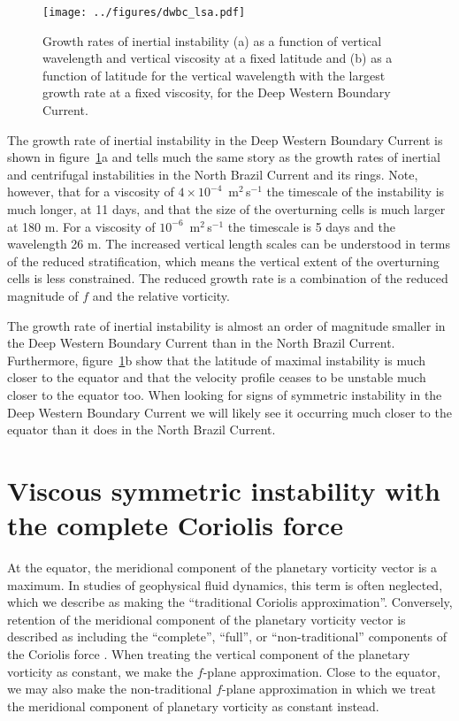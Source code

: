 \begin{figure}[t]
    \centering
    \texttt{[image: ../figures/dwbc\_lsa.pdf]}
    \caption{Growth rates of inertial instability (a) as a function of vertical wavelength and vertical viscosity at a fixed latitude and (b) as a function of latitude for the vertical wavelength with the largest growth rate at a fixed viscosity, for the Deep Western Boundary Current.}
    \label{fig:lsaDWBC}
\end{figure}

The growth rate of inertial instability in the Deep Western Boundary Current is shown in figure~\ref{fig:lsaDWBC}a and tells much the same story as the growth rates of inertial and centrifugal instabilities in the North Brazil Current and its rings. Note, however, that for a viscosity of $4 \times 10^{-4}$~m$^2\,$s$^{-1}$ the timescale of the instability is much longer, at 11 days, and that the size of the overturning cells is much larger at 180 m. For a viscosity of $10^{-6}$~m$^2\,$s$^{-1}$ the timescale is 5 days and the wavelength 26 m. The increased vertical length scales can be understood in terms of the reduced stratification, which means the vertical extent of the overturning cells is less constrained. The reduced growth rate is a combination of the reduced magnitude of $f$ and the relative vorticity.

The growth rate of inertial instability is almost an order of magnitude smaller in the Deep Western Boundary Current than in the North Brazil Current. Furthermore, figure~\ref{fig:lsaDWBC}b show that the latitude of maximal instability is much closer to the equator and that the velocity profile ceases to be unstable much closer to the equator too. When looking for signs of symmetric instability in the Deep Western Boundary Current we will likely see it occurring much closer to the equator than it does in the North Brazil Current.

\section{Viscous symmetric instability with the complete Coriolis force}
\label{sec:DrasticSI}
    At the equator, the meridional component of the planetary vorticity vector is a maximum. In studies of geophysical fluid dynamics, this term is often neglected, which we describe as making the ``traditional Coriolis approximation''. Conversely, retention of the meridional component of the planetary vorticity vector is described as including the ``complete'', ``full'', or ``non-traditional'' components of the Coriolis force \citep{Stewart2011}. When treating the vertical component of the planetary vorticity as constant, we make the $f$-plane approximation. Close to the equator, we may also make the non-traditional $f$-plane approximation in which we treat the meridional component of planetary vorticity as constant instead.

